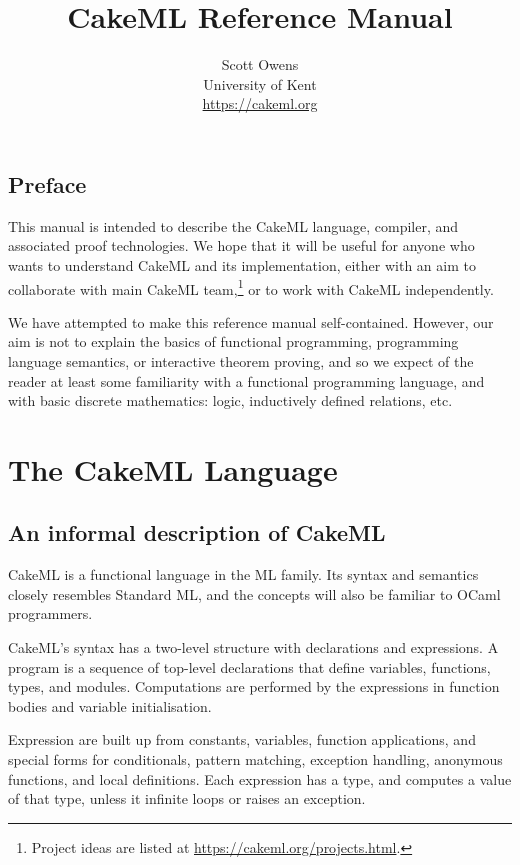 \documentclass[12pt,a4paper]{book}
\title{CakeML Reference Manual}
\author{Scott Owens\\
University of Kent\\
\url{https://cakeml.org}
}
\begin{document}
\sloppy
\maketitle
\frenchspacing

\frontmatter

\chapter{Preface}

This manual is intended to describe the CakeML language, compiler, and associated proof technologies. We hope that it will be useful for anyone who wants to understand  CakeML and its implementation, either with an aim to collaborate with main CakeML team,\footnote{Project ideas are listed at \url{https://cakeml.org/projects.html}.}
or to work with CakeML independently.

We have attempted to make this reference manual self-contained. However, our aim is not to explain the basics of functional programming, programming language semantics, or interactive theorem proving, and so we expect of the reader at least some familiarity with a functional programming language, and with basic discrete mathematics: logic, inductively defined relations, etc.

\mainmatter
\tableofcontents


\part{The CakeML Language}

\chapter{An informal description of CakeML}

CakeML is a functional language in the ML family. Its syntax and semantics
closely resembles Standard ML, and the concepts will also be familiar to OCaml
programmers.

CakeML's syntax has a two-level structure with declarations and expressions. A
program is a sequence of top-level declarations that define variables,
functions, types, and modules. Computations are performed by the expressions in
function bodies and variable initialisation.

Expression are built up from constants, variables, function applications, and
special forms for conditionals, pattern matching, exception handling, anonymous
functions, and local definitions. Each expression has a type, and computes a
value of that type, unless it infinite loops or raises an exception.
\end{document}
